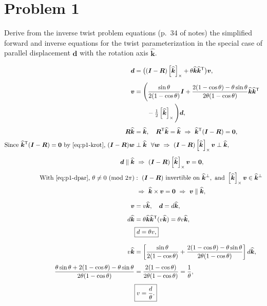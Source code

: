 \documentclass[11pt]{article}
\newcommand{\R}{\bm{R}}
\newcommand{\dvec}{\bm{d}}
\newcommand{\khat}{\widehat{\bm{k}}}
\newcommand{\vvec}{\bm{v}}
\newcommand{\skewx}[1]{\left[#1\right]_{\times}}
\begin{document}
\section*{Problem 1}

\begin{statement}
Derive from the inverse twist problem equations (p.~34 of notes) the simplified forward and inverse
equations for the twist parameterization in the special case of parallel displacement $\dvec$ with the
rotation axis $\khat$.
\end{statement}

\begin{align}
\dvec &= \big((\bm{I}-\R)\skewx{\khat} + \theta\khat\khat^{\mathsf{T}}\big)\vvec, \label{eq:p1-forward}\\[4pt]
\vvec &= \Bigg(\frac{\sin\theta}{2(1-\cos\theta)}\bm{I} + \frac{2(1-\cos\theta)-\theta\sin\theta}{2\theta(1-\cos\theta)}\khat\khat^{\mathsf{T}} \notag\\
&\qquad{}- \tfrac{1}{2}\skewx{\khat}\Bigg)\dvec, \label{eq:p1-inverse}\\[4pt]
\R\khat&=\khat,\quad \R^{\mathsf T}\khat=\khat \ \Rightarrow\ \khat^{\mathsf T}(\bm I-\R)=\bm 0, \label{eq:p1-krot}\\[2pt]
\text{Since } \khat^{\mathsf T}(\bm I-\R)=\bm 0\ \text{by \eqref{eq:p1-krot}, } (\bm I-\R)\bm w&\perp\khat\ \ \forall\bm w \ \Rightarrow\ (\bm I-\R)\skewx{\khat}\vvec \perp \khat, \label{eq:p1-perp}\\[4pt]
\dvec\parallel\khat &\ \Rightarrow\ (\bm I-\R)\skewx{\khat}\vvec = \bm 0, \label{eq:p1-dpar}\\[2pt]
\text{With \eqref{eq:p1-dpar}, }\theta\neq0\ (\mathrm{mod}\ 2\pi)&:\ (\bm I-\R)\ \text{invertible on}\ \khat^{\perp},\ \text{and}\ \skewx{\khat}\vvec\in\khat^{\perp}\notag\\
&\ \Rightarrow\ \khat\times\vvec=\bm 0 \ \Rightarrow\ \vvec\parallel\khat, \label{eq:p1-vpar}\\[6pt]
\vvec&=v\khat,\quad \dvec=d\khat,\\[4pt]
d\khat &= \theta\khat\khat^{\mathsf T}(v\khat) = \theta v\khat,\\[2pt]
&\boxed{d=\theta v,} \label{eq:p1-fwd-final}\\[8pt]
v\khat &= \left[\frac{\sin\theta}{2(1-\cos\theta)}+\frac{2(1-\cos\theta)-\theta\sin\theta}{2\theta(1-\cos\theta)}\right]d\khat,\\[4pt]
\frac{\theta\sin\theta+2(1-\cos\theta)-\theta\sin\theta}{2\theta(1-\cos\theta)}&=\frac{2(1-\cos\theta)}{2\theta(1-\cos\theta)}=\frac{1}{\theta},\\[4pt]
&\boxed{v=\dfrac{d}{\theta}.} \label{eq:p1-inv-final}
\end{align}
\end{document}
